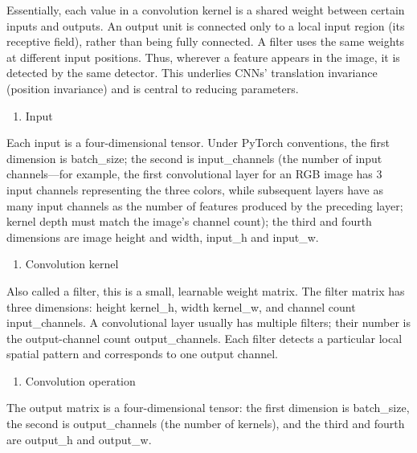 Essentially, each value in a convolution kernel is a shared weight between certain inputs and outputs. An output unit is connected only to a local input region (its receptive field), rather than being fully connected. A filter uses the same weights at different input positions. Thus, wherever a feature appears in the image, it is detected by the same detector. This underlies CNNs' translation invariance (position invariance) and is central to reducing parameters.

\begin{enumerate}
\def\labelenumi{(\arabic{enumi})}
\setcounter{enumi}{1}
\tightlist
\item
  Input
\end{enumerate}

Each input is a four-dimensional tensor. Under PyTorch conventions, the first dimension is batch\_size; the second is input\_channels (the number of input channels---for example, the first convolutional layer for an RGB image has 3 input channels representing the three colors, while subsequent layers have as many input channels as the number of features produced by the preceding layer; kernel depth must match the image's channel count); the third and fourth dimensions are image height and width, input\_h and input\_w.

\begin{enumerate}
\def\labelenumi{(\arabic{enumi})}
\setcounter{enumi}{2}
\tightlist
\item
  Convolution kernel
\end{enumerate}

Also called a filter, this is a small, learnable weight matrix. The filter matrix has three dimensions: height kernel\_h, width kernel\_w, and channel count input\_channels. A convolutional layer usually has multiple filters; their number is the output-channel count output\_channels. Each filter detects a particular local spatial pattern and corresponds to one output channel.

\begin{enumerate}
\def\labelenumi{(\arabic{enumi})}
\setcounter{enumi}{3}
\tightlist
\item
  Convolution operation
\end{enumerate}

The output matrix is a four-dimensional tensor: the first dimension is batch\_size, the second is output\_channels (the number of kernels), and the third and fourth are output\_h and output\_w.

